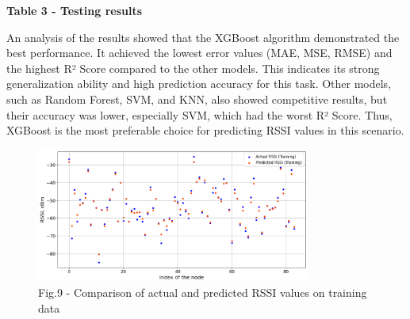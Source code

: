 {\bfseries Table 3 - Testing results}


An analysis of the results showed that the XGBoost algorithm
demonstrated the best performance. It achieved the lowest error values
(MAE, MSE, RMSE) and the highest R² Score compared to the other models.
This indicates its strong generalization ability and high prediction
accuracy for this task. Other models, such as Random Forest, SVM, and
KNN, also showed competitive results, but their accuracy was lower,
especially SVM, which had the worst R² Score. Thus, XGBoost is the most
preferable choice for predicting RSSI values in this scenario.


\begin{figure}[H]
	\centering
	\includegraphics[width=0.8\textwidth]{media/ict/image49}
	\caption*{Fig.9 - Comparison of actual and predicted RSSI values on training data}
\end{figure}

